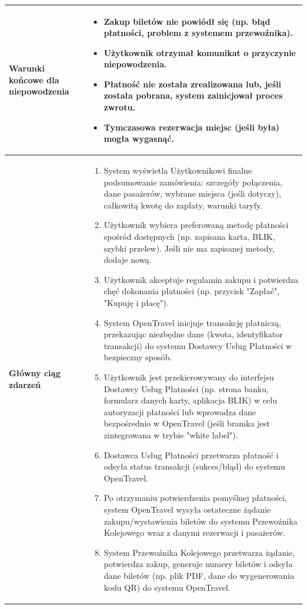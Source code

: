 \documentclass[a4paper,12pt]{article}
\begin{document}
\begin{longtable}{|p{\pierwszakolumnaszerokoscPUBKZakup}|p{\drugakolumnaszerokoscPUBKZakup}|}
    \textbf{Warunki końcowe dla niepowodzenia} &
        \begin{itemize} \itemsep0pt \parskip0pt \parsep0pt
            \item Zakup biletów nie powiódł się (np. błąd płatności, problem z systemem przewoźnika).
            \item Użytkownik otrzymał komunikat o przyczynie niepowodzenia.
            \item Płatność nie została zrealizowana lub, jeśli została pobrana, system zainicjował proces zwrotu.
            \item Tymczasowa rezerwacja miejsc (jeśli była) mogła wygasnąć.
        \end{itemize} \\
    \hline
    \textbf{Główny ciąg zdarzeń} &
        \begin{enumerate} \itemsep0pt \parskip0pt \parsep0pt
            \item System wyświetla Użytkownikowi finalne podsumowanie zamówienia: szczegóły połączenia, dane pasażerów, wybrane miejsca (jeśli dotyczy), całkowitą kwotę do zapłaty, warunki taryfy.
            \item Użytkownik wybiera preferowaną metodę płatności spośród dostępnych (np. zapisana karta, BLIK, szybki przelew). Jeśli nie ma zapisanej metody, dodaje nową.
            \item Użytkownik akceptuje regulamin zakupu i potwierdza chęć dokonania płatności (np. przycisk "Zapłać", "Kupuję i płacę").
            \item System OpenTravel inicjuje transakcję płatniczą, przekazując niezbędne dane (kwota, identyfikator transakcji) do systemu Dostawcy Usług Płatności w bezpieczny sposób.
            \item Użytkownik jest przekierowywany do interfejsu Dostawcy Usług Płatności (np. strona banku, formularz danych karty, aplikacja BLIK) w celu autoryzacji płatności lub wprowadza dane bezpośrednio w OpenTravel (jeśli bramka jest zintegrowana w trybie "white label").
            \item Dostawca Usług Płatności przetwarza płatność i odsyła status transakcji (sukces/błąd) do systemu OpenTravel.
            \item Po otrzymaniu potwierdzenia pomyślnej płatności, system OpenTravel wysyła ostateczne żądanie zakupu/wystawienia biletów do systemu Przewoźnika Kolejowego wraz z danymi rezerwacji i pasażerów.
            \item System Przewoźnika Kolejowego przetwarza żądanie, potwierdza zakup, generuje numery biletów i odsyła dane biletów (np. plik PDF, dane do wygenerowania kodu QR) do systemu OpenTravel.

\end{enumerate}
\end{longtable}
\end{document}
